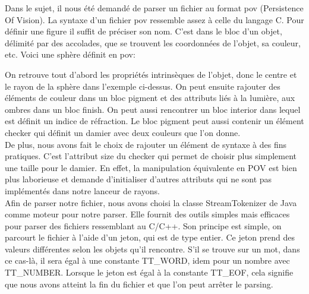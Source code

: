 \documentclass[../../Rapport RayTracer]{subfiles}
\begin{document}
Dans le sujet, il nous été demandé de parser un fichier au format pov (Persistence Of Vision). La syntaxe d'un fichier pov ressemble assez à celle du langage C. Pour définir une figure il suffit de préciser son nom. C'est dans le bloc d'un objet, délimité par des accolades, que se trouvent les coordonnées de l'objet, sa couleur, etc. Voici une sphère définit en pov:

 

On retrouve tout d'abord les propriétés intrinsèques de l'objet, donc le centre et le rayon de la sphère dans l'exemple ci-dessus. On peut ensuite rajouter des éléments de couleur dans un bloc pigment et des attributs liés à la lumière, aux ombres dans un bloc finish. On peut aussi rencontrer un bloc interior dans lequel est définit un indice de réfraction.
Le bloc pigment peut aussi contenir un élément checker qui définit un damier avec deux couleurs que l'on donne.
\\
De plus, nous avons fait le choix de rajouter un élément de syntaxe à des fins pratiques. C'est l'attribut size du checker qui permet de choisir plus simplement une taille pour le damier. En effet, la manipulation équivalente en POV est bien plus laborieuse et demande d'initialiser d'autres attributs qui ne sont pas implémentés dans notre lanceur de rayons.
\\
 Afin de parser notre fichier, nous avons choisi la classe StreamTokenizer de Java comme moteur pour notre parser. Elle fournit des outils simples mais efficaces pour parser des fichiers ressemblant au C/C++. Son principe est simple, on parcourt le fichier à l'aide d'un jeton, qui est de type entier. Ce jeton prend des valeurs différentes selon les objets qu'il rencontre. S'il se trouve sur un mot, dans ce cas-là, il sera égal à une constante TT\_WORD, idem pour un nombre avec TT\_NUMBER. Lorsque le jeton est égal à la constante TT\_EOF, cela signifie que nous avons atteint la fin du fichier et que l'on peut arrêter le parsing.
\end{document}
